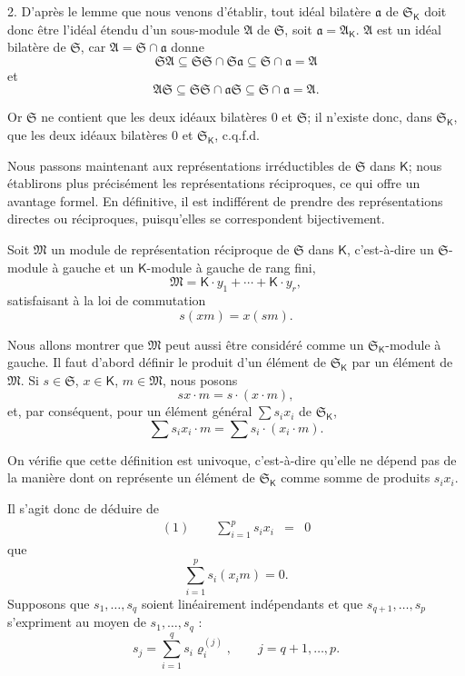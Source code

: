 2. D'après le lemme que nous venons d'établir, tout idéal bilatère \(\mathfrak a\) de \(\mathfrak S_{\mathsf K}\) doit donc être l'idéal étendu d'un sous-module \(\mathfrak A\) de \(\mathfrak S\), soit \(\mathfrak a=\mathfrak A_{\mathsf K}\). \(\mathfrak A\) est un idéal bilatère de \(\mathfrak S\), car \(\mathfrak A=\mathfrak S\cap\mathfrak a\) donne
\[
\mathfrak S\mathfrak A\subseteq\mathfrak S\mathfrak S\cap\mathfrak S\mathfrak a
\subseteq\mathfrak S\cap\mathfrak a=\mathfrak A
\]
et
\[
\mathfrak A\mathfrak S\subseteq\mathfrak S\mathfrak S\cap\mathfrak a\mathfrak S
\subseteq\mathfrak S\cap\mathfrak a=\mathfrak A.
\]

Or \(\mathfrak S\) ne contient que les deux idéaux bilatères \(0\) et \(\mathfrak S\); il n'existe donc, dans \(\mathfrak S_{\mathsf K}\), que les deux idéaux bilatères \(0\) et \(\mathfrak S_{\mathsf K}\), c.q.f.d.

Nous passons maintenant aux représentations irréductibles de \(\mathfrak S\) dans \(\mathsf K\); nous établirons plus précisément les représentations réciproques, ce qui offre un avantage formel. En définitive, il est indifférent de prendre des représentations directes ou réciproques, puisqu'elles se correspondent bijectivement.

Soit \(\mathfrak M\) un module de représentation réciproque de \(\mathfrak S\) dans \(\mathsf K\), c'est-à-dire un \(\mathfrak S\)-module à gauche et un \(\mathsf K\)-module à gauche de rang fini,
\[
\mathfrak M=\mathsf K\cdot y_1+\cdots+\mathsf K\cdot y_r,
\]
satisfaisant à la loi de commutation
\[
s(xm)=x(sm).
\]

Nous allons montrer que \(\mathfrak M\) peut aussi être considéré comme un \(\mathfrak S_{\mathsf K}\)-module à gauche. Il faut d'abord définir le produit d'un élément de \(\mathfrak S_{\mathsf K}\) par un élément de \(\mathfrak M\). Si \(s\in\mathfrak S\), \(x\in\mathsf K\), \(m\in\mathfrak M\), nous posons
\[
sx\cdot m=s\cdot(x\cdot m),
\]
et, par conséquent, pour un élément général \(\sum s_ix_i\) de \(\mathfrak S_{\mathsf K}\),
\[
\sum s_ix_i\cdot m=\sum s_i\cdot(x_i\cdot m).
\]

On vérifie que cette définition est univoque, c'est-à-dire qu'elle ne dépend pas de la manière dont on représente un élément de \(\mathfrak S_{\mathsf K}\) comme somme de produits \(s_ix_i\).

Il s'agit donc de déduire de
\[
\begin{array}{rcl}
(1)\qquad \displaystyle\sum_{i=1}^{p}s_ix_i&=&0
\end{array}
\]
que
\[
\sum_{i=1}^{p}s_i(x_i m)=0.
\]
Supposons que \(s_1,\ldots,s_q\) soient linéairement indépendants et que \(s_{q+1},\ldots,s_p\) s'expriment au moyen de \(s_1,\ldots,s_q\) :
\[
s_j=\sum_{i=1}^{q}s_i\varrho_i^{(j)},
\qquad j=q+1,\ldots,p.
\]


